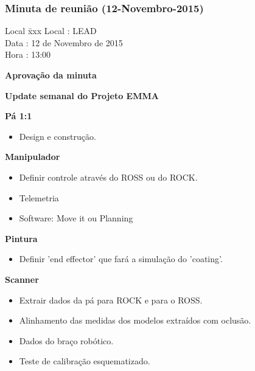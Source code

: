 \subsubsection{Minuta de reunião (12-Novembro-2015)}

\begin{tabbing}
  Local \= xxx \kill
  Local \> : LEAD \\
  Data  \> : 12 de Novembro de 2015 \\
  Hora  \> : 13:00
\end{tabbing} 


\textbf{Aprovação da minuta}

\textbf{Update semanal do Projeto EMMA} 

   									
					
		
		\item \textbf{Pá 1:1}
			\begin{itemize} 
			    \item Design e construção.
			\end{itemize}
			
		\item \textbf{Manipulador}
			\begin{itemize} 
			    \item Definir controle através do ROSS ou do ROCK.
			    \item Telemetria
			    \item Software: Move it ou Planning
			\end{itemize}	

		\item \textbf{Pintura\Coating}
			\begin{itemize} 
			    \item Definir 'end effector' que fará a simulação do 'coating'.
			\end{itemize}	
		
		\item \textbf{Scanner}
			\begin{itemize} 
			    \item Extrair dados da pá para  ROCK e para o ROSS.
			    \item Alinhamento das medidas dos modelos extraídos com oclusão.
			    \item Dados do braço robótico.
			    \item Teste de calibração esquematizado.
			\end{itemize}
			
